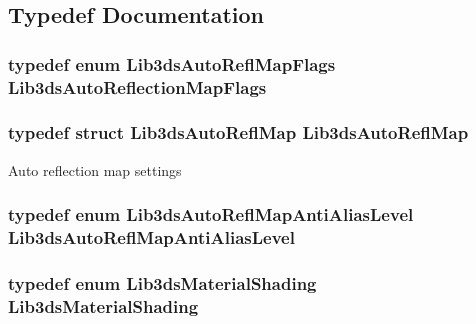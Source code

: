 \subsection{Typedef Documentation}
\hypertarget{group__material_gabe0747056dcdc0983db5e31e4b9c08ce}{
\subsubsection[{Lib3ds\-Auto\-Reflection\-Map\-Flags}]{\setlength{\rightskip}{0pt plus 5cm}typedef enum {\bf Lib3ds\-Auto\-Refl\-Map\-Flags}  {\bf Lib3ds\-Auto\-Reflection\-Map\-Flags}}}\label{group__material_gabe0747056dcdc0983db5e31e4b9c08ce}
\hypertarget{group__material_ga94f3cb70730d4ac53973512d04f74905}{
\subsubsection[{Lib3ds\-Auto\-Refl\-Map}]{\setlength{\rightskip}{0pt plus 5cm}typedef {\bf struct} {\bf Lib3ds\-Auto\-Refl\-Map}  {\bf Lib3ds\-Auto\-Refl\-Map}}}\label{group__material_ga94f3cb70730d4ac53973512d04f74905}
Auto reflection map settings \hypertarget{group__material_ga0a1dda34b42ffa956d04980b01d30be7}{
\subsubsection[{Lib3ds\-Auto\-Refl\-Map\-Anti\-Alias\-Level}]{\setlength{\rightskip}{0pt plus 5cm}typedef enum {\bf Lib3ds\-Auto\-Refl\-Map\-Anti\-Alias\-Level}  {\bf Lib3ds\-Auto\-Refl\-Map\-Anti\-Alias\-Level}}}\label{group__material_ga0a1dda34b42ffa956d04980b01d30be7}
\hypertarget{group__material_gaca1388400cc0dec5fe679457cd861686}{
\subsubsection[{Lib3ds\-Material\-Shading}]{\setlength{\rightskip}{0pt plus 5cm}typedef enum {\bf Lib3ds\-Material\-Shading}  {\bf Lib3ds\-Material\-Shading}}}\label{group__material_gaca1388400cc0dec5fe679457cd861686}
